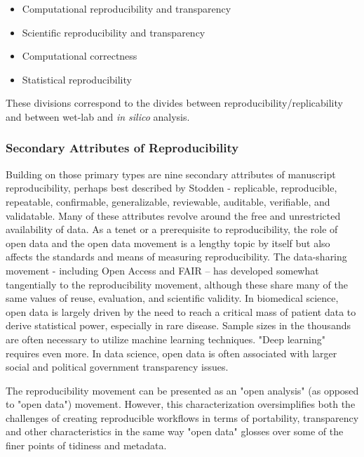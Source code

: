 \documentclass{drexelthesis}
\begin{document}
\begin{itemize}
	\item Computational reproducibility and transparency

	\item Scientific reproducibility and transparency

	\item Computational correctness

	\item Statistical reproducibility

\end{itemize}
These divisions correspond to the divides between reproducibility/replicability and between wet-lab and \textit{in silico} analysis.

\subsubsection{Secondary Attributes of Reproducibility}

Building on those primary types are nine secondary attributes of manuscript reproducibility, perhaps best described by Stodden - replicable, reproducible, repeatable, confirmable, generalizable, reviewable, auditable, verifiable, and validatable. Many of these attributes revolve around the free and unrestricted availability of data. As a tenet or a prerequisite to reproducibility, the role of open data and the open data movement is a lengthy topic by itself but also affects the standards and means of measuring reproducibility. The data-sharing movement - including Open Access and FAIR \cite{Wilkinson2016-qr}-- has developed somewhat tangentially to the reproducibility movement, although these share many of the same values of reuse, evaluation, and scientific validity. In biomedical science, open data is largely driven by the need to reach a critical mass of patient data to derive statistical power, especially in rare disease. Sample sizes in the thousands are often necessary to utilize machine learning techniques. "Deep learning" requires even more. In data science, open data is often associated with larger social and political government transparency issues.

The reproducibility movement can be presented as an "open analysis" (as opposed to "open data") movement. However, this characterization oversimplifies both the challenges of creating reproducible workflows in terms of portability, transparency and other characteristics in the same way "open data" glosses over some of the finer points of tidiness and metadata.
\end{document}

